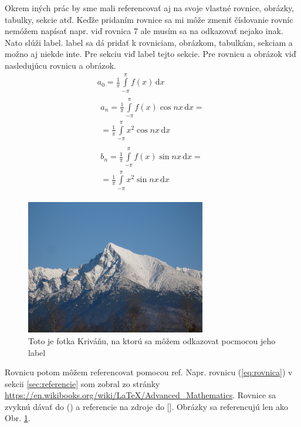 \documentclass[11pt, a4paper]{article}
\begin{document}
Okrem iných prác by sme mali referencovať aj na svoje vlastné rovnice, obrázky, tabulky, sekcie atď. Keďže pridaním rovnice sa mi môže zmeniť číslovanie rovníc nemóžem napísať napr. viď rovnica 7 ale musím sa na odkazovať nejako inak. Nato slúži label. label sa dá pridať k rovniciam, obrázkom, tabulkám, sekciam a možno aj niekde inte. Pre sekciu viď label tejto sekcie. Pre rovnicu a obrázok viď nasledujúcu rovnicu a obrázok.
\begin{gather}
a_0=\frac{1}{\pi}\int\limits_{-\pi}^{\pi}f(x)\,\mathrm{d}x\\[6pt]
\begin{split}
a_n=\frac{1}{\pi}\int\limits_{-\pi}^{\pi}f(x)\cos nx\,\mathrm{d}x=\\
=\frac{1}{\pi}\int\limits_{-\pi}^{\pi}x^2\cos nx\,\mathrm{d}x
\end{split}\\[6pt]
\begin{split}
b_n=\frac{1}{\pi}\int\limits_{-\pi}^{\pi}f(x)\sin nx\,\mathrm{d}x=\\
=\frac{1}{\pi}\int\limits_{-\pi}^{\pi}x^2\sin nx\,\mathrm{d}x
\end{split} \label{eq:rovnica}
\end{gather}

\begin{figure}[H]
  \centering
      \includegraphics[width=0.7\textwidth]{krivan}
      \caption{Toto je fotka Kriváňu, na ktorú sa môžem odkazovat pocmocou jeho label \label{fig:krivan}}
\end{figure}

Rovnicu potom môžem referencovat pomocou ref. Napr. rovnicu (\ref{eq:rovnica}) v sekcii \ref{sec:referencie} som zobral zo stránky \url{https://en.wikibooks.org/wiki/LaTeX/Advanced_Mathematics}. Rovnice sa zvyknú dávať do () a referencie na zdroje do []. Obrázky sa referencujú len ako Obr. \ref{fig:krivan}.
\end{document}

